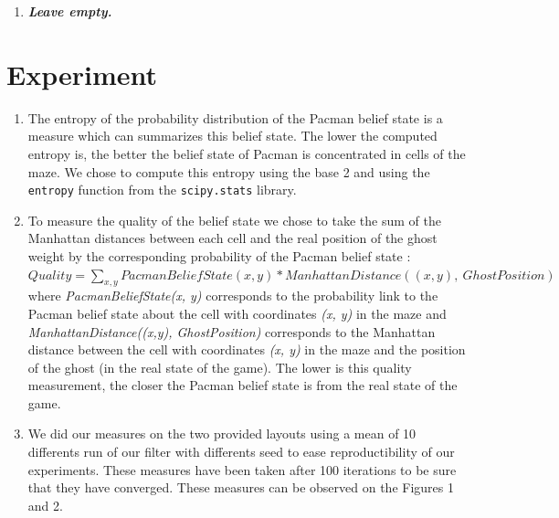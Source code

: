 \documentclass{article}
\begin{document}
\begin{enumerate}[label=\alph*.,leftmargin=*]
    \item \textbf{\textit{Leave empty.}}
\end{enumerate}

\section{Experiment}

\begin{enumerate}[label=\alph*.,leftmargin=*]
    \item The entropy of the probability distribution of the Pacman belief state is a measure which can summarizes this belief state. 
    The lower the computed entropy is, the better the belief state of Pacman is concentrated in cells of the maze. We chose to compute this entropy using the base 2 and using the \texttt{entropy} function from the \texttt{scipy.stats} library.
    \item To measure the quality of the belief state we chose to take the sum of the Manhattan distances between each cell and the real position of the ghost weight by the corresponding probability of the Pacman belief state :\\
    
    $Quality = {\sum_{x, y} {PacmanBeliefState(x, y) * ManhattanDistance((x, y), \ GhostPosition)}}$\\

    where \textit{PacmanBeliefState(x, y)} corresponds to the probability link to the Pacman belief state about the cell with coordinates \textit{(x, y)} in the maze and \textit{ManhattanDistance((x,y), GhostPosition)} corresponds
    to the Manhattan distance between the cell with coordinates \textit{(x, y)} in the maze and the position of the ghost (in the real state of the game). The lower is this quality measurement, the closer the Pacman belief state is from the real state of the game.
    \item We did our measures on the two provided layouts using a mean of 10 differents run of our filter with differents seed to ease reproductibility of our experiments. These measures have been taken after 100 iterations to be sure that they have converged.
    These measures can be observed on the Figures 1 and 2. 


\end{enumerate}
\end{document}
